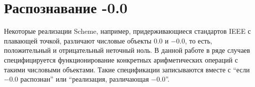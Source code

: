 \section{Распознавание -0.0}\vspace{-2mm}

 Некоторые реализации Scheme, например, придерживающиеся стандартов IEEE с
плавающей точкой, различают числовые объекты $0.0$ и $-0.0$, то есть, положительный и
отрицательный неточный ноль. В данной работе в ряде случаев специфицируется функционирование
конкретных арифметических операций с такими числовыми объектами. Такие спецификации записываются
вместе с ``если $-0.0$ распознан'' или ``реализация, различающая $-0.0$''.\vspace{-4mm}


